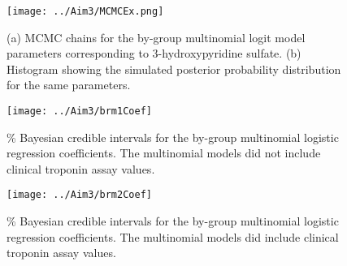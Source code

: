 \begin{landscape}
\begin{figure}[H]
	\texttt{[image: ../Aim3/MCMCEx.png]}
	\caption[Time series plot of the MCMC chain for 3-hydroxypyridine sulfate multinomial logistic regression coefficient and resulting histogram showing the posterior distribution]{(a) MCMC chains for the by-group multinomial logit model parameters corresponding to 3-hydroxypyridine sulfate. (b) Histogram showing the simulated posterior probability distribution for the same parameters. \label{fig:brm1Coef} }
\end{figure}
\newpage
\begin{figure}[H]
	\texttt{[image: ../Aim3/brm1Coef]}
	\caption[Bayesian credible intervals for multinomial logit model parameters without troponin]{\% Bayesian credible intervals for the by-group multinomial logistic regression coefficients. The multinomial models did not include clinical troponin assay values. \label{fig:brm1Coef} }
\end{figure}
\newpage
\begin{figure}[H]
	\texttt{[image: ../Aim3/brm2Coef]}
	\caption[Bayesian credible intervals for multinomial logit model parameters with troponin]{\% Bayesian credible intervals for the by-group multinomial logistic regression coefficients. The multinomial models did include clinical troponin assay values. \label{fig:brm2Coef} }
\end{figure}
\end{landscape}

